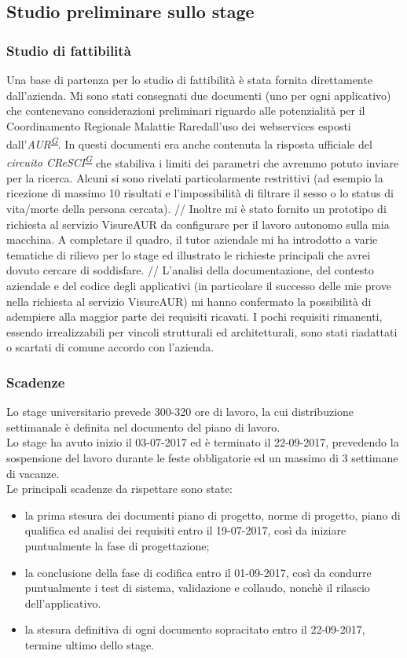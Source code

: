 \documentclass[a4paper]{article}
\newcommand{\crmr}{Coordinamento Regionale Malattie Rare}
\begin{document}
\subsection{Studio preliminare sullo stage}

\subsubsection{Studio di fattibilità}
Una base di partenza per lo studio di fattibilità è stata fornita direttamente dall'azienda. Mi sono stati consegnati due documenti (uno per ogni applicativo) che contenevano considerazioni preliminari riguardo alle potenzialità per il \crmr dall'uso dei webservices esposti dall'\textit{AUR\textsuperscript{\hyperref[sec:gl]{G}}}. In questi documenti era anche contenuta la risposta ufficiale del \textit{circuito CReSCI\textsuperscript{\hyperref[sec:gl]{G}}} che stabiliva i limiti dei parametri che avremmo potuto inviare per la ricerca. Alcuni si sono rivelati particolarmente restrittivi (ad esempio la ricezione di massimo 10 risultati e l'impossibilità di filtrare il sesso o lo status di vita/morte della persona cercata).
//
Inoltre mi è stato fornito un prototipo di richiesta al servizio VisureAUR da configurare per il lavoro autonomo sulla mia macchina. A completare il quadro, il tutor aziendale mi ha introdotto a varie tematiche di rilievo per lo stage ed illustrato le richieste principali che avrei dovuto cercare di soddisfare.
//
L'analisi della documentazione, del contesto aziendale e del codice degli applicativi (in particolare il successo delle mie prove nella richiesta al servizio VisureAUR) mi hanno confermato la possibilità di adempiere alla maggior parte dei requisiti ricavati. I pochi requisiti rimanenti, essendo irrealizzabili per vincoli strutturali ed architetturali, sono stati riadattati o scartati di comune accordo con l'azienda.

\subsubsection{Scadenze}
Lo stage universitario prevede 300-320 ore di lavoro, la cui distribuzione settimanale è definita nel documento del piano di lavoro.
\\
Lo stage ha avuto inizio il 03-07-2017 ed è terminato il 22-09-2017, prevedendo la sospensione del lavoro durante le feste obbligatorie ed un massimo di 3 settimane di vacanze.
\\
Le principali scadenze da rispettare sono state:
\begin{itemize}
	\item la prima stesura dei documenti piano di progetto, norme di progetto, piano di qualifica ed analisi dei requisiti entro il 19-07-2017, così da iniziare puntualmente la fase di progettazione;
    \item la conclusione della fase di codifica entro il 01-09-2017, così da condurre puntualmente i test di sistema, validazione e collaudo, nonchè il rilascio dell'applicativo.
    \item la stesura definitiva di ogni documento sopracitato entro il 22-09-2017, termine ultimo dello stage.
\end{itemize}
\end{document}
